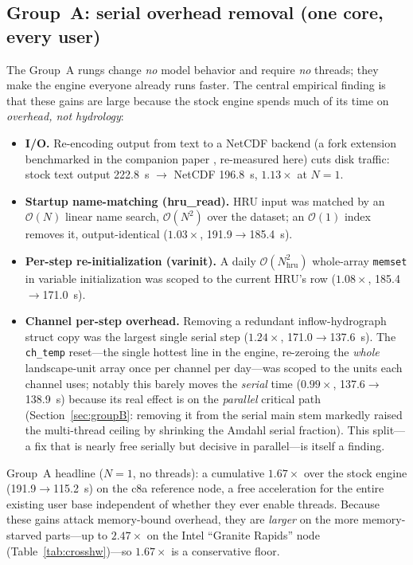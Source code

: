 \subsection{Group~A: serial overhead removal (one core, every user)}\label{sec:groupA}
The Group~A rungs change \emph{no} model behavior and require \emph{no} threads; they make the
engine everyone already runs faster. The central empirical finding is that these gains are
large because the stock engine spends much of its time on \emph{overhead, not hydrology}:
\begin{itemize}
  \item \textbf{I/O.} Re-encoding output from text to a NetCDF backend (a fork extension benchmarked in the companion paper \citep{Rafiei2026SWATGenX}, re-measured here) cuts disk traffic: stock text output
        222.8~s $\rightarrow$ NetCDF 196.8~s, $1.13\times$ at $N{=}1$.
  \item \textbf{Startup name-matching (hru\_read).} HRU input was matched by an $\mathcal{O}(N)$
        linear name search, $\mathcal{O}(N^2)$ over the dataset; an $\mathcal{O}(1)$ index removes
        it, output-identical ($1.03\times$, 191.9$\rightarrow$185.4~s).
  \item \textbf{Per-step re-initialization (varinit).} A daily $\mathcal{O}(N_{\mathrm{hru}}^2)$
        whole-array \texttt{memset} in variable initialization was scoped to the current HRU's
        row ($1.08\times$, 185.4$\rightarrow$171.0~s).
  \item \textbf{Channel per-step overhead.} Removing a redundant inflow-hydrograph struct copy was
        the largest single serial step ($1.24\times$, 171.0$\rightarrow$137.6~s). The
        \texttt{ch\_temp} reset---the single hottest line in the engine, re-zeroing the
        \emph{whole} landscape-unit array once per channel per day---was scoped to the units each
        channel uses; notably this barely moves the \emph{serial} time ($0.99\times$,
        137.6$\rightarrow$138.9~s) because its real effect is on the \emph{parallel} critical path
        (Section~\ref{sec:groupB}: removing it from the serial main stem markedly raised the
        multi-thread ceiling by shrinking the Amdahl serial fraction). This split---a fix that is
        nearly free serially but decisive in parallel---is itself a finding.
\end{itemize}
Group~A headline ($N{=}1$, no threads): a cumulative $1.67\times$ over the stock engine
(191.9$\rightarrow$115.2~s) on the c8a reference node, a free acceleration for the entire existing
user base independent of whether they ever enable threads. Because these gains attack
memory-bound overhead, they are \emph{larger} on the more memory-starved parts---up to $2.47\times$
on the Intel ``Granite Rapids'' node (Table~\ref{tab:crosshw})---so $1.67\times$ is a
conservative floor.

